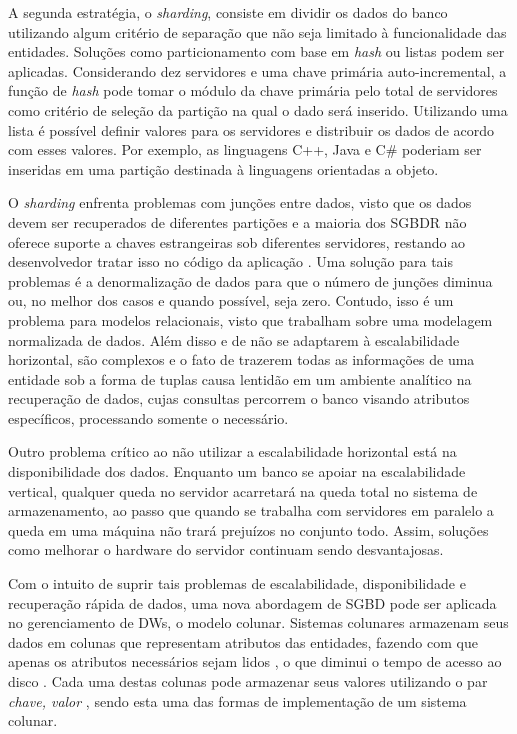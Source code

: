 A segunda estratégia, o \textit{sharding}, consiste em dividir os dados do banco 
utilizando algum critério de separação que não seja limitado à 
funcionalidade das entidades. Soluções como particionamento com base em 
\textit{hash} ou listas podem ser aplicadas. Considerando dez servidores e uma chave 
primária auto-incremental, a função de \textit{hash} pode tomar o módulo da chave 
primária pelo total de servidores como critério de seleção da partição 
na qual o dado será inserido. Utilizando uma lista é possível definir valores 
para os servidores e distribuir os dados de acordo com esses valores. 
Por exemplo, as linguagens C++, Java e C\# poderiam ser inseridas em uma 
partição destinada à linguagens orientadas a objeto.

O \textit{sharding} enfrenta problemas com junções entre dados, visto que os dados 
devem ser recuperados de diferentes partições e a maioria dos SGBDR não 
oferece suporte a chaves estrangeiras sob diferentes servidores, restando 
ao desenvolvedor tratar isso no código da aplicação \cite{pritchett2008base}. 
Uma solução para tais 
problemas é a denormalização de dados para que o número de junções diminua ou, 
no melhor dos casos e quando possível, seja zero. Contudo, isso é um problema 
para modelos relacionais, visto que trabalham sobre uma modelagem normalizada de dados. 
Além disso e de não se adaptarem à escalabilidade horizontal, 
são complexos e o fato de trazerem todas as informações de uma entidade sob a 
forma de tuplas causa lentidão em um ambiente analítico na recuperação de dados, 
cujas consultas percorrem o banco visando atributos específicos, processando 
somente o necessário. 

Outro problema crítico ao não utilizar a escalabilidade horizontal está na 
disponibilidade dos dados. Enquanto um banco se apoiar na escalabilidade vertical, 
qualquer queda no servidor acarretará na queda total no sistema de armazenamento, 
ao passo que quando se trabalha com servidores em paralelo a queda em uma máquina 
não trará prejuízos no conjunto todo. Assim, soluções como melhorar o hardware do 
servidor continuam sendo desvantajosas. 

Com o intuito de suprir tais problemas de escalabilidade, disponibilidade e recuperação rápida de dados, uma 
nova abordagem de SGBD pode ser aplicada no gerenciamento de DWs, o modelo colunar. Sistemas colunares armazenam seus dados 
em colunas que representam atributos das entidades, fazendo com que apenas os atributos necessários sejam 
lidos \cite{khoshafian1987query}, o que diminui o tempo de acesso 
ao disco \cite{matei2010column, abadi2008column}. Cada uma destas colunas pode armazenar seus valores utilizando o par 
\textit{chave, valor} \cite{abadi2013design, khoshafian1987query}, sendo esta uma das formas de implementação 
de um sistema colunar. 

